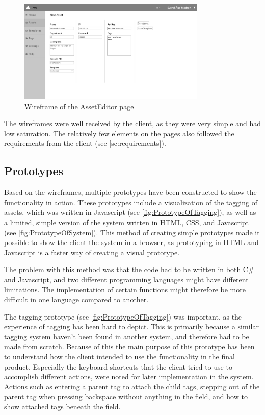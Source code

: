 \begin{figure}[H]
    \centering
    \includegraphics[width=0.8\textwidth]{figures/wireframes/AssetEditor_Wireframe.png}
    \caption{Wireframe of the AssetEditor page}
    \label{fig:AssetEditor_Wireframe}
\end{figure}

The wireframes were well received by the client, as they were very simple and had low saturation. The relatively few elements on the pages also followed the requirements from the client (see \autoref{sc:requirements}).

\subsection{Prototypes}
Based on the wireframes, multiple prototypes have been constructed to show the functionality in action. These prototypes include a visualization of the tagging of assets, which was written in Javascript (see \autoref{fig:PrototypeOfTagging}), as well as a limited, simple version of the system written in HTML, CSS, and Javascript (see \autoref{fig:PrototypeOfSystem}). This method of creating simple prototypes made it possible to show the client the system in a browser, as prototyping in HTML and Javascript is a faster way of creating a visual prototype.
\par
The problem with this method was that the code had to be written in both C\# and Javascript, and two different programming languages might have different limitations. The implementation of certain functions might therefore be more difficult in one language compared to another.
\par
The tagging prototype (see \autoref{fig:PrototypeOfTagging}) was important, as the experience of tagging has been hard to depict. This is primarily because a similar tagging system haven't been found in another system, and therefore had to be made from scratch. Because of this the main purpose of this prototype has been to understand how the client intended to use the functionality in the final product. Especially the keyboard shortcuts that the client tried to use to accomplish different actions, were noted for later implementation in the system. Actions such as entering a parent tag to attach the child tags, stepping out of the parent tag when pressing backspace without anything in the field, and how to show attached tags beneath the field.


